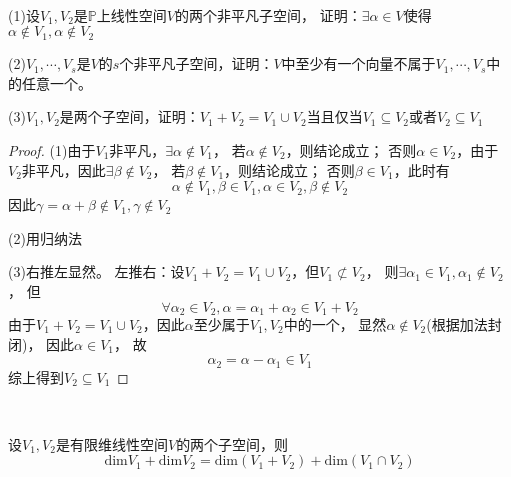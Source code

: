 ~

\begin{exercise}[和与并的区别]
  (1)设$V_1,V_2$是$\mathbb{P}$上线性空间$V$的两个非平凡子空间，
  证明：$\exists \alpha \in V$使得$\alpha \not\in V_1, \alpha \not\in V_2$

  (2)$V_1,\cdots,V_s$是$V$的$s$个非平凡子空间，证明：$V$中至少有一个向量不属于$V_1,\cdots,V_s$中的任意一个。

  (3)$V_1,V_2$是两个子空间，证明：$V_1 + V_2 = V_1 \cup V_2$当且仅当$V_1 \subseteq V_2$或者$V_2 \subseteq V_1$
\end{exercise}

\begin{proof}
  (1)由于$V_1$非平凡，$\exists \alpha \not \in V_1$，
  若$\alpha \not\in V_2$，则结论成立；
  否则$\alpha \in V_2$，由于$V_2$非平凡，因此$\exists \beta \not \in V_2$，
  若$\beta \not\in V_1$，则结论成立；
  否则$\beta \in V_1$，此时有
  \begin{equation*}
    \alpha \not \in V_1, \beta \in V_1, \alpha \in V_2, \beta \not\in V_2
  \end{equation*}
  因此$\gamma = \alpha + \beta \not \in V_1, \gamma \not \in V_2$

  (2)用归纳法

  (3)右推左显然。
  左推右：设$V_1 + V_2 = V_1 \cup V_2$，但$V_1 \not \subset V_2$，
  则$\exists \alpha_1 \in V_1, \alpha_1 \not\in V_2$，
  但
  \begin{equation*}
    \forall \alpha_2 \in V_2,  \alpha = \alpha_1 + \alpha_2 \in V_1 + V_2
  \end{equation*}
  由于$V_1 + V_2 = V_1 \cup V_2$，因此$\alpha$至少属于$V_1,V_2$中的一个，
  显然$\alpha \not\in V_2$(根据加法封闭)，
  因此$\alpha \in V_1$，
  故
  \begin{equation*}
    \alpha_2 = \alpha - \alpha_1 \in V_1
  \end{equation*}
  综上得到$V_2 \subseteq V_1$
\end{proof}

~

\begin{theorem}[维数公式]
  设$V_1,V_2$是有限维线性空间$V$的两个子空间，则
  \begin{equation*}
    \mathrm{dim} V_1 + \mathrm{dim} V_2 = \mathrm{dim} (V_1 + V_2) + \mathrm{dim}(V_1 \cap V_2)
  \end{equation*}
\end{theorem}

